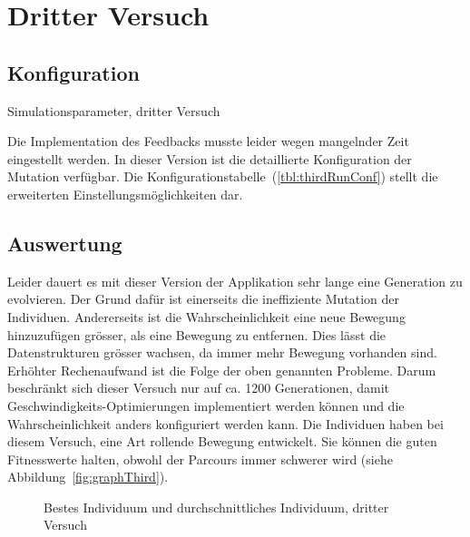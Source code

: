   \section{Dritter Versuch}

    \subsection{Konfiguration}

      \begin{table}[H]
        \centering
        
        \caption{Simulationsparameter, dritter Versuch\label{tbl:thirdRunConf}}
      \end{table}

      Die Implementation des Feedbacks musste leider wegen mangelnder Zeit eingestellt werden.
      In dieser Version ist die detaillierte Konfiguration der Mutation verfügbar.
      Die Konfigurationstabelle~(\vref{tbl:thirdRunConf}) stellt die erweiterten Einstellungsmöglichkeiten dar.

    \subsection{Auswertung\label{sub:thirdAuswertung}}

      Leider dauert es mit dieser Version der Applikation sehr lange eine Generation zu evolvieren.
      Der Grund dafür ist einerseits die ineffiziente Mutation der Individuen.
      Andererseits ist die Wahrscheinlichkeit eine neue Bewegung hinzuzufügen grösser, als eine Bewegung zu entfernen.
      Dies lässt die Datenstrukturen grösser wachsen, da immer mehr Bewegung vorhanden sind.
      Erhöhter Rechenaufwand ist die Folge der oben genannten Probleme.
      Darum beschränkt sich dieser Versuch nur auf ca. 1200 Generationen,
      damit Geschwindigkeits-Optimierungen implementiert werden können und die Wahrscheinlichkeit anders konfiguriert werden kann.
      Die Individuen haben bei diesem Versuch, eine Art rollende Bewegung entwickelt.
      Sie können die guten Fitnesswerte halten,
      obwohl der Parcours immer schwerer wird (siehe Abbildung~\vref{fig:graphThird}).

      \begin{figure}
        \centering
        
        \caption{Bestes Individuum und durchschnittliches Individuum, dritter Versuch\label{fig:graphThird}}
      \end{figure}

